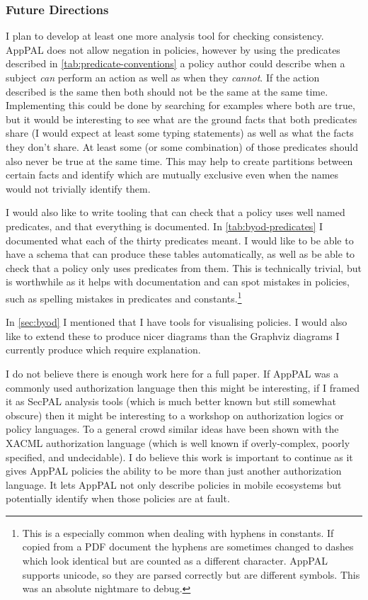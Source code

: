 \documentclass[a4paper]{scrartcl}
\begin{document}
\subsubsection*{Future Directions}

I plan to develop at least one more analysis tool for checking consistency.
AppPAL does not allow negation in policies, however by using the predicates
described in \autoref{tab:predicate-conventions} a policy author could describe
when a subject \emph{can} perform an action as well as when they \emph{cannot}.
If the action described is the same then both should not be the same at the same
time.  Implementing this could be done by searching for examples where both are
true, but it would be interesting to see what are the ground facts that both
predicates share (I would expect at least some typing statements) as well as
what the facts they don't share.  At least some (or some combination) of those
predicates should also never be true at the same time.  This may help to create
partitions between certain facts and identify which are mutually exclusive even
when the names would not trivially identify them.

I would also like to write tooling that can check that a policy uses well named
predicates, and that everything is documented.  In \autoref{tab:byod-predicates}
I documented what each of the thirty predicates meant.  I would like to be able
to have a schema that can produce these tables automatically, as well as be able to
check that a policy only uses predicates from them.  This is technically
trivial, but is worthwhile as it helps with documentation and can spot mistakes
in policies, such as spelling mistakes in predicates and constants.\footnote{This is a
  especially common when dealing with hyphens in constants.  If copied from a
  PDF document the hyphens are sometimes changed to dashes which look identical
  but are counted as a different character.  AppPAL supports unicode, so they
  are parsed correctly but are different symbols.  This was an absolute
  nightmare to debug.}

In \autoref{sec:byod} I mentioned that I have tools for visualising policies.  I
would also like to extend these to produce nicer diagrams than the Graphviz
diagrams I currently produce which require explanation.

I do not believe there is enough work here for a full paper.  If AppPAL was a
commonly used authorization language then this might be interesting, if I framed
it as SecPAL analysis tools (which is much better known but still somewhat
obscure) then it might be interesting to a workshop on authorization logics or
policy languages.   To a general crowd similar ideas have been shown with the
XACML authorization language (which is well known if overly-complex, poorly
specified, and undecidable).  I do believe this work is important to continue as
it gives AppPAL policies the ability to be more than just another authorization
language. It lets AppPAL not only describe policies in mobile ecosystems but
potentially identify when those policies are at fault.
\end{document}
